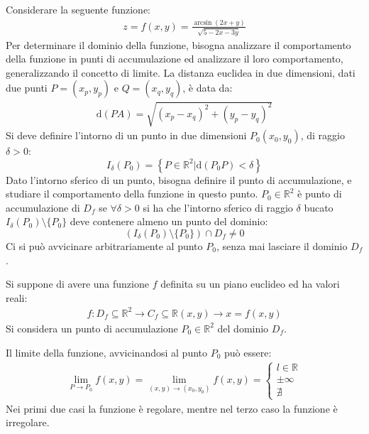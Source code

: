 \documentclass{article}
\newcommand{\df}{\mathrm{d}}
\numberwithin{equation}{subsection}
\begin{document}
Considerare la seguente funzione:
\begin{gather*}
    z=f(x,y)=\displaystyle\frac{\arcsin(2x+y)}{\sqrt{5-2x-3y}}
\end{gather*}
Per determinare il dominio della funzione, bisogna analizzare il comportamento della funzione in punti di accumulazione ed analizzare il loro comportamento, generalizzando il concetto di limite. La distanza euclidea in due dimensioni, dati due punti $P=(x_p,y_p)$ e $Q=(x_q,y_q)$, è data da:
\begin{gather*}
    \df(PA)=\sqrt{(x_p-x_q)^2+(y_p-y_q)^2}
\end{gather*}
Si deve definire l'intorno di un punto in due dimensioni $P_0(x_0,y_0)$, di raggio $\delta>0$:
\begin{equation}
    I_\delta(P_0)=\left\{P\in\mathbb{R}^2\big| \df (P_0P)<\delta\right\}
\end{equation}
Dato l'intorno sferico di un punto, bisogna definire il punto di accumulazione, e studiare il comportamento della funzione in questo punto. 
$P_0\in\mathbb{R}^2$ è punto di accumulazione di $D_f$ se $\forall\delta>0$ si ha che l'intorno sferico di raggio $\delta$ bucato $I_\delta(P_0)\setminus\{P_0\}$ deve contenere almeno un punto del dominio:
\begin{equation}
    \left(I_\delta(P_0)\setminus\{P_0\}\right)\cap D_f\neq0
\end{equation}
Ci si può avvicinare arbitrariamente al punto $P_0$, senza mai lasciare il dominio $D_f$. 

Si suppone di avere una funzione $f$ definita su un piano euclideo ed ha valori reali:
\begin{gather*}
    f: D_f\subseteq\mathbb{R}^2\to C_f\subseteq\mathbb{R}
    (x,y)\to x=f(x,y)%
\end{gather*}
Si considera un punto di accumulazione $P_0\in\mathbb{R}^2$ del dominio $D_f$. 

Il limite della funzione, avvicinandosi al punto $P_0$ può essere:
\begin{gather*}
    \lim_{P\to P_0}f(x,y)=\lim_{(x,y)\to (x_0,y_0)}f(x,y)=\begin{cases}
        l\in\mathbb{R}\\
        \pm\infty\\
        \nexists
    \end{cases}
\end{gather*}
Nei primi due casi la funzione è regolare, mentre nel terzo caso la funzione è irregolare. 
\end{document}
